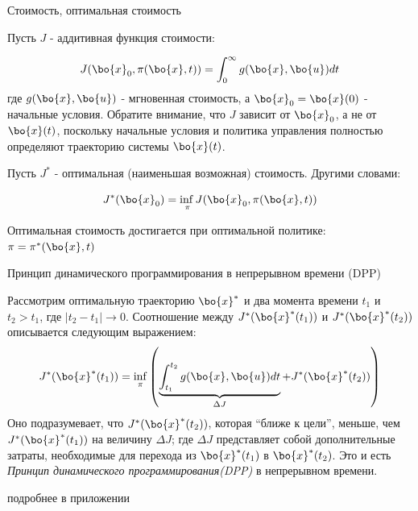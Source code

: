 \documentclass{beamer}
\begin{document}
\begin{frame}{Стоимость, оптимальная стоимость}
	\begin{flushleft}
		
		Пусть $J$ - аддитивная функция стоимости:
		
		\begin{equation}
			J (\bo{x}_0, \pi (\bo{x}, t)) = \int_0^\infty g(\bo{x}, \bo{u}) dt
		\end{equation}
		где $g(\bo{x}, \bo{u})$ - мгновенная стоимость, а $\bo{x}_0 = \bo{x}(0)$ - начальные условия. Обратите внимание, что $J$ зависит от $\bo{x}_0$, а не от $\bo{x}(t)$, поскольку начальные условия и политика управления полностью определяют траекторию системы $\bo{x}(t)$.
		
		\bigskip
		
		Пусть $J^*$ - оптимальная (наименьшая возможная) стоимость. Другими словами:
		
		\begin{equation}
			J^*(\bo{x}_0) = \underset{\pi}{\inf{}} J(\bo{x}_0, \pi (\bo{x}, t))
		\end{equation}
		
		Оптимальная стоимость достигается при оптимальной политике: $\pi = \pi^*(\bo{x}, t)$
		
	\end{flushleft}
\end{frame}



\begin{frame}{Принцип динамического программирования в непрерывном времени (DPP)}
	\begin{flushleft}
		
		Рассмотрим оптимальную траекторию $\bo{x}^*$ и два момента времени $t_1$ и $t_2 > t_1$, где $|t_2 - t_1| \rightarrow 0$. Соотношение между $J^*(\bo{x}^*(t_1))$ и $J^*(\bo{x}^*(t_2))$ описывается следующим выражением:
		\begin{equation}
			J^*(\bo{x}^*(t_1)) = \inf_\pi \left(  \underbrace{\int_{t_1}^{t_2} g(\bo{x}, \bo{u}) dt }_{\Delta J} +  J^*(\bo{x}^*(t_2))  \right)
		\end{equation}
		Оно подразумевает, что $J^*(\bo{x}^*(t_2))$, которая ``ближе к цели'', меньше, чем $J^*(\bo{x}^*(t_1))$ на величину $\Delta J$; где $\Delta J$ представляет собой дополнительные затраты, необходимые для перехода из $\bo{x}^*(t_1)$ в $\bo{x}^*(t_2)$. Это и есть \emph{Принцип динамического программирования(DPP)}  в непрерывном времени.
		
		\bigskip
		
		\textcolor{mygray}{подробнее в приложении}
		
	\end{flushleft}
\end{frame}
\end{document}
